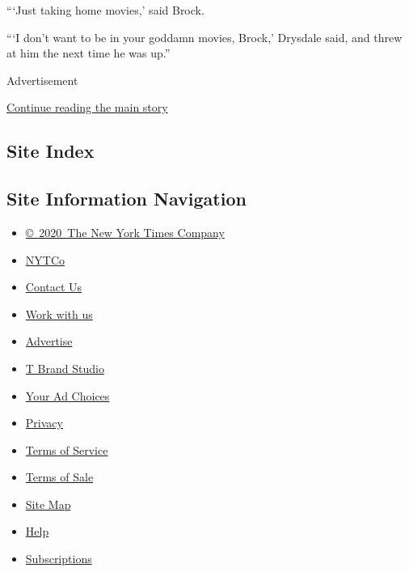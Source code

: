 ```Just taking home movies,' said Brock.

```I don't want to be in your goddamn movies, Brock,' Drysdale said, and
threw at him the next time he was up.''

Advertisement

\protect\hyperlink{after-bottom}{Continue reading the main story}

\hypertarget{site-index}{%
\subsection{Site Index}\label{site-index}}

\hypertarget{site-information-navigation}{%
\subsection{Site Information
Navigation}\label{site-information-navigation}}

\begin{itemize}
\tightlist
\item
  \href{https://help.nytimes3xbfgragh.onion/hc/en-us/articles/115014792127-Copyright-notice}{©~2020~The
  New York Times Company}
\end{itemize}

\begin{itemize}
\tightlist
\item
  \href{https://www.nytco.com/}{NYTCo}
\item
  \href{https://help.nytimes3xbfgragh.onion/hc/en-us/articles/115015385887-Contact-Us}{Contact
  Us}
\item
  \href{https://www.nytco.com/careers/}{Work with us}
\item
  \href{https://nytmediakit.com/}{Advertise}
\item
  \href{http://www.tbrandstudio.com/}{T Brand Studio}
\item
  \href{https://www.nytimes3xbfgragh.onion/privacy/cookie-policy\#how-do-i-manage-trackers}{Your
  Ad Choices}
\item
  \href{https://www.nytimes3xbfgragh.onion/privacy}{Privacy}
\item
  \href{https://help.nytimes3xbfgragh.onion/hc/en-us/articles/115014893428-Terms-of-service}{Terms
  of Service}
\item
  \href{https://help.nytimes3xbfgragh.onion/hc/en-us/articles/115014893968-Terms-of-sale}{Terms
  of Sale}
\item
  \href{https://spiderbites.nytimes3xbfgragh.onion}{Site Map}
\item
  \href{https://help.nytimes3xbfgragh.onion/hc/en-us}{Help}
\item
  \href{https://www.nytimes3xbfgragh.onion/subscription?campaignId=37WXW}{Subscriptions}
\end{itemize}
